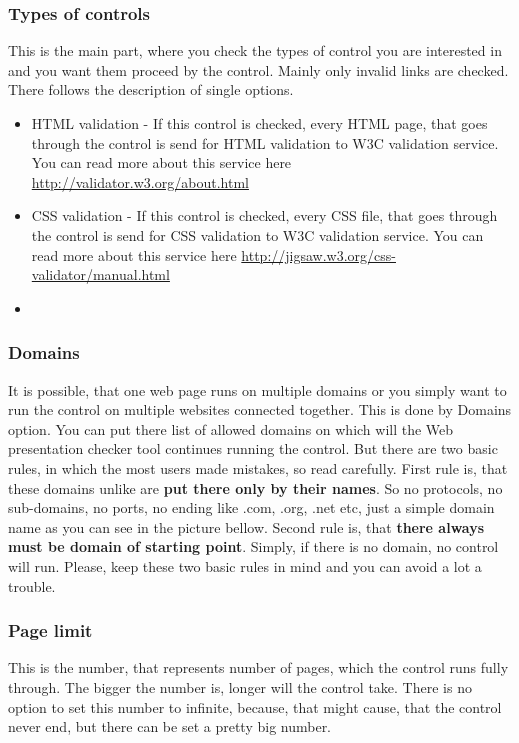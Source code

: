 \documentclass[12pt,a4paper]{article}
\begin{document}
\subsubsection{Types of controls}
This is the main part, where you check the types of control you are interested in and you want them proceed by the control. Mainly only invalid links are checked.
There follows the description of single options.
\begin{itemize}
	\item HTML validation - If this control is checked, every HTML page, that goes through the control is send for HTML validation to W3C validation service. You can read more about this service here \url{http://validator.w3.org/about.html}
	\item CSS validation - If this control is checked, every CSS file, that goes through the control is send for CSS validation to W3C validation service. You can read more about this service here \url{http://jigsaw.w3.org/css-validator/manual.html}
	\item
\end{itemize}

\subsubsection{Domains}
It is possible, that one web page runs on multiple domains or you simply want to run the control on multiple websites connected together. This is done by Domains option. You can put there list of allowed domains on which will the Web presentation checker tool continues running the control. But there are two basic rules, in which the most users made mistakes, so read carefully. First rule is, that these domains unlike  are \textbf{put there only by their names}. So no protocols, no sub-domains, no ports, no ending like .com, .org, .net etc, just a simple domain name as you can see in the picture bellow. Second rule is, that \textbf{there always must be domain of  starting point}. Simply, if there is no domain, no control will run. Please, keep these two basic rules in mind and you can avoid a lot a trouble.
\subsubsection{Page limit}
This is the number, that represents number of pages, which the control runs fully through. The bigger the number is, longer will the control take. There is no option to set this number to infinite, because, that might cause, that the control never end, but there can be set a pretty big number.
\end{document}
